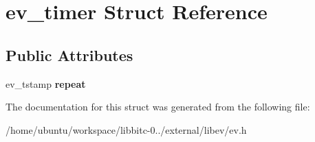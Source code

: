 \hypertarget{structev__timer}{\section{ev\-\_\-timer Struct Reference}
\label{structev__timer}
}
\subsection*{Public Attributes}
\begin{DoxyCompactItemize}
\item 
\hypertarget{structev__timer_a4d2b34c259adabc6ddc738b89341c249}{ev\-\_\-tstamp {\bfseries repeat}}\label{structev__timer_a4d2b34c259adabc6ddc738b89341c249}

\end{DoxyCompactItemize}


The documentation for this struct was generated from the following file\-:\begin{DoxyCompactItemize}
\item 
/home/ubuntu/workspace/libbitc-\/0../external/libev/ev.\-h\end{DoxyCompactItemize}
